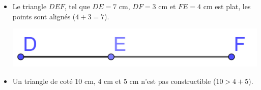 \documentclass[xcolor={dvipsnames}]{beamer}
\begin{document}
\begin{frame}
	\begin{myexs}
		
		\begin{itemize}
			\item Le triangle $DEF$, tel que $DE = 7$ cm, $DF = 3$ cm et $FE = 4$ cm est plat, les points sont alignés ($4 + 3 = 7$).
			\begin{center}
				
				\includegraphics[scale=0.2]{triangle2}\pause
			\end{center}
			
			\item 	Un triangle de coté 10 cm, 4 cm et 5 cm n'est pas constructible ($10 > 4 + 5$).
		\end{itemize}
		
		
		
	\end{myexs}
\end{frame}
\end{document}
